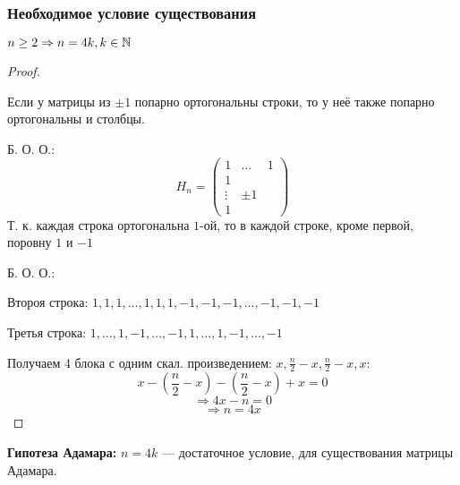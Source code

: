 \subsubsection{Необходимое условие существования}
\begin{theorem}
\label{theorem:02_1}
  $n \geq 2 \Rightarrow n = 4k, k \in \mathbb{N}$
\end{theorem}
\begin{proof}
\begin{task}
  Если у матрицы из $\pm 1$ попарно ортогональны строки, то у неё также попарно ортогональны и столбцы.
\end{task}
Б. О. О.:
\[
  H_n = \begin{pmatrix}1 & \ldots & 1 \\ 1 \\ \vdots & \pm 1 \\ 1 \end{pmatrix}
\]
Т. к. каждая строка ортогональна $1$-ой, то в каждой строке, кроме первой, поровну $1$ и $-1$

Б. О. О.:

Второя строка: $1, 1, 1, \ldots, 1, 1, 1, -1, -1, -1, \ldots, -1, -1, -1$

Третья строка: $1, \ldots, 1, -1, \ldots, -1, 1, \ldots, 1, -1, \ldots, -1$

Получаем 4 блока с одним скал. произведением: $x, \frac{n}{2} - x, \frac{n}{2} - x, x$:
\[
  x - \left(\frac{n}{2} - x\right) - \left(\frac{n}{2} - x\right) + x = 0
\]
\[
  \Rightarrow 4x - n = 0
\]
\[
  \Rightarrow n = 4x
\]
\end{proof}
\textbf{Гипотеза Адамара:} $n = 4k$ --- достаточное условие, для существования матрицы Адамара.

